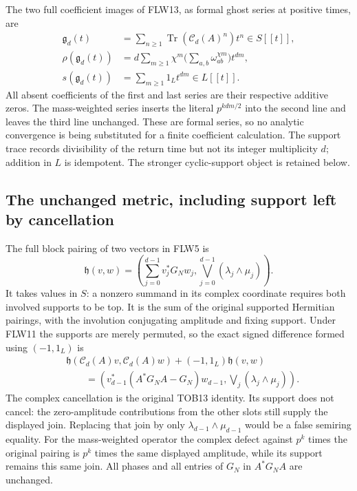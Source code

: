 The two full coefficient images of FLW13, as formal ghost series
at positive times, are
\[
\begin{split}
 \mathfrak g_d(t)&=\sum_{n\ge1}
                  \operatorname{Tr}(\mathcal C_d(A)^n)t^n\in S[[t]],\\
 \rho(\mathfrak g_d(t))
     &=d\sum_{m\ge1}\chi^m
                       \Big(\sum_{a,b}\omega_{ab}^{\chi m}\Big)t^{dm},\\
 s(\mathfrak g_d(t))&=\sum_{m\ge1}1_L t^{dm}\in L[[t]].
\end{split}
\tag{FLW15}
\]
All absent coefficients of the first and last series are their
respective additive zeros. The mass-weighted series inserts the
literal $p^{kdm/2}$ into the second line and leaves the third line
unchanged. These are formal series, so no analytic convergence is
being substituted for a finite coefficient calculation. The support
trace records divisibility of the return time but not its integer
multiplicity $d$; addition in $L$ is idempotent. The stronger
cyclic-support object is retained below.

\subsection{The unchanged metric, including support left by cancellation}

The full block pairing of two vectors in FLW5 is
\[
 \mathfrak h(v,w)=
   \left(\sum_{j=0}^{d-1}v_j^*G_Nw_j,
                     \bigvee_{j=0}^{d-1}(\lambda_j\wedge\mu_j)\right).
 \tag{FLW16}
\]
It takes values in $S$: a nonzero summand in its complex coordinate
requires both involved supports to be top. It is the sum of the
original supported Hermitian pairings, with the involution conjugating
amplitude and fixing support. Under FLW11 the supports are merely
permuted, so the exact signed difference formed using $(-1,1_L)$ is
\[
\begin{split}
 &\mathfrak h(\mathcal C_d(A)v,\mathcal C_d(A)w)
                  +(-1,1_L)\mathfrak h(v,w)\\
 &\qquad=
 \left(v_{d-1}^*(A^*G_NA-G_N)w_{d-1},
                     \bigvee_j(\lambda_j\wedge\mu_j)\right).
\end{split}
\tag{FLW17}
\]
The complex cancellation is the original TOB13 identity. Its support
does not cancel: the zero-amplitude contributions from the other
slots still supply the displayed join. Replacing that join by only
$\lambda_{d-1}\wedge\mu_{d-1}$ would be a false semiring equality.
For the mass-weighted operator the complex defect against $p^k$
times the original pairing is $p^k$ times the same displayed
amplitude, while its support remains this same join. All phases
and all entries of $G_N$ in $A^*G_NA$ are unchanged.

